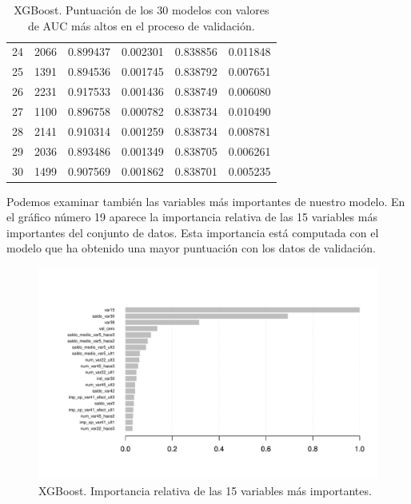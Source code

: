 \documentclass[11pt,a4paper,spanish]{article} %
\begin{document}
\begin{table}[!htbp]
\begin{center}
\begin{tabular}{rccccc}
  24 & 2066 & 0.899437 & 0.002301 & 0.838856 & 0.011848 \\ 
  25 & 1391 & 0.894536 & 0.001745 & 0.838792 & 0.007651 \\ 
  26 & 2231 & 0.917533 & 0.001436 & 0.838749 & 0.006080 \\ 
  27 & 1100 & 0.896758 & 0.000782 & 0.838734 & 0.010490 \\ 
  28 & 2141 & 0.910314 & 0.001259 & 0.838734 & 0.008781 \\ 
  29 & 2036 & 0.893486 & 0.001349 & 0.838705 & 0.006261 \\ 
  30 & 1499 & 0.907569 & 0.001862 & 0.838701 & 0.005235 \\ 
   \hline
\end{tabular}
\end{center}
\caption{XGBoost. Puntuación de los 30 modelos con valores de AUC más altos en el proceso de validación.}
\end{table}

\vspace{0.8cm}

Podemos examinar también las variables más importantes de nuestro modelo. En el gráfico número 19 aparece la importancia relativa de las 15 variables más importantes del conjunto de datos. Esta importancia está computada con el modelo que ha obtenido una mayor puntuación con los datos de validación. 

\begin{figure}[h!]
	\begin{center}
	\includegraphics[width=\textwidth]{Z_06_01_XGB_imp_vars.pdf}
    \caption{XGBoost. Importancia relativa de las 15 variables más importantes.}
    \end{center}
\end{figure}
\end{document}
